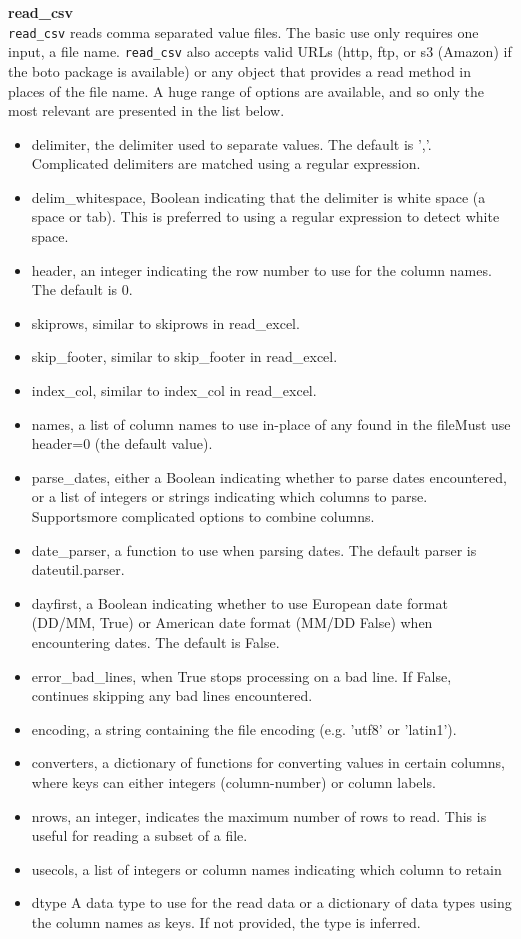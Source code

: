 \documentclass[KSmain.tex]{subfiles}
\begin{document}
	\textbf{read\_csv}\\
	\texttt{read\_csv} reads comma separated value files. The basic use only requires one input, a file name. \texttt{read\_csv}
	also accepts valid URLs (http, ftp, or s3 (Amazon) if the boto package is available) or any object that provides
	a read method in places of the file name. A huge range of options are available, and so only the most
	relevant are presented in the list below.
	\begin{itemize}
		\item delimiter, the delimiter used to separate values. The default is ’,’. Complicated delimiters are
		matched using a regular expression.
		\item delim\_whitespace, Boolean indicating that the delimiter is white space (a space or tab). This is preferred
		to using a regular expression to detect white space.
		\item header, an integer indicating the row number to use for the column names. The default is 0.
		\item skiprows, similar to skiprows in read\_excel.
		\item skip\_footer, similar to skip\_footer in read\_excel.
		\item index\_col, similar to index\_col in read\_excel.
		\item names, a list of column names to use in-place of any found in the fileMust use header=0 (the default
		value).
		\item parse\_dates, either a Boolean indicating whether to parse dates encountered, or a list of integers or
		strings indicating which columns to parse. Supportsmore complicated options to combine columns.
		\item date\_parser, a function to use when parsing dates. The default parser is dateutil.parser.
		\item dayfirst, a Boolean indicating whether to use European date format (DD/MM, True) or American
		date format (MM/DD False) when encountering dates. The default is False.
		\item error\_bad\_lines, when True stops processing on a bad line. If False, continues skipping any bad
		lines encountered.
		\item encoding, a string containing the file encoding (e.g. ’utf8’
		or ’latin1’).
		\item converters, a dictionary of functions for converting values in certain columns, where keys can either
		integers (column-number) or column labels.
		\item nrows, an integer, indicates the maximum number of rows to read. This is useful for reading a subset
		of a file.
		\item usecols, a list of integers or column names indicating which column to retain
		\item dtype A data type to use for the read data or a dictionary of data types using the column names as
		keys. If not provided, the type is inferred.
	\end{itemize}
\end{document}

